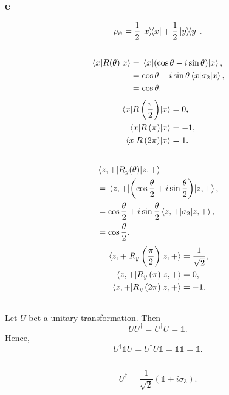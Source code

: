 \documentclass[a4paper,12pt,twoside]{article}
\begin{document}
\begin{multicols*}{2}
\subsubsection*{e}
\begin{equation}
    \rho_\psi = \frac{1}{2} \op{x} + \frac{1}{2} \op{y}.
\end{equation}
\subsection{}%
\begin{align}
    \ev{R(\theta)}{x} &= \ev{(\cos\theta-i\sin\theta)}{x},\\
    &= \cos\theta - i\sin\theta\ev{\sigma_2}{x},\\
    &= \cos\theta.
\end{align}
\begin{align}
    \ev{R\left(\frac{\pi}{2}\right)}{x} &= 0,\\
    \ev{R\left(\pi\right)}{x} &= -1,\\
    \ev{R\left(2\pi\right)}{x} &= 1.
\end{align}
\subsection{}%
\begin{align}
    &\ev{R_y(\theta)}{z,+}\\ &= \ev{\left(\cos\frac{\theta}{2}+i\sin\frac{\theta}{2}\right)}{z,+},\\
    &= \cos\frac{\theta}{2} + i\sin\frac{\theta}{2}\ev{\sigma_2}{z,+},\\
    &= \cos\frac{\theta}{2}.
\end{align}
\begin{align}
    \ev{R_y\left(\frac{\pi}{2}\right)}{z,+} &= \frac{1}{\sqrt{2}},\\
    \ev{R_y\left(\pi\right)}{z,+} &= 0,\\
    \ev{R_y\left(2\pi\right)}{z,+} &= -1.
\end{align}
\subsection{}%
Let $U$ bet a unitary transformation.
Then
\[
    UU^\dagger = U^\dagger U = \mathbb{1}.
\]
Hence,
\[
    U^\dagger \mathbb{1} U = U^\dagger U \mathbb{1} = \mathbb{11} = \mathbb{1}.
\]
\subsection{}%
\begin{equation}
    U^\dagger = \frac{1}{\sqrt{2}} (\mathbb{1}+i\sigma_3).
\end{equation}

\end{multicols*}
\end{document}
